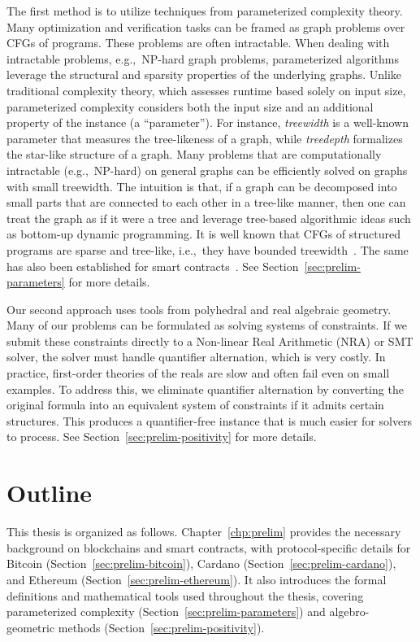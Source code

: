  The first method is to utilize techniques from parameterized complexity theory.
Many optimization and verification tasks can be framed as graph problems over CFGs of programs. These problems are often intractable. When dealing with intractable problems, e.g.,~NP-hard graph problems, parameterized algorithms leverage the structural and sparsity properties of the underlying graphs. Unlike traditional complexity theory, which assesses runtime based solely on input size, parameterized complexity considers both the input size and an additional property of the instance (a ``parameter''). For instance, \textit{treewidth} is a well-known parameter that measures the tree-likeness of a graph, while \textit{treedepth} formalizes the star-like structure of a graph. Many problems that are computationally intractable (e.g.,~NP-hard) on general graphs can be efficiently solved on graphs with small treewidth. The intuition is that, if a graph can be decomposed into small parts that are connected to each other in a tree-like manner, then one can treat the graph as if it were a tree and leverage tree-based algorithmic ideas such as bottom-up dynamic programming. It is well known that CFGs of structured programs are sparse and tree-like, i.e.,~they have bounded treewidth~\cite{thorup1998all}. The same has also been established for smart contracts~\cite{chatterjee2019treewidth}. See Section~\ref{sec:prelim-parameters} for more details.

 Our second approach uses tools from polyhedral and real algebraic geometry. Many of our problems can be formulated as solving systems of constraints. If we submit these constraints directly to a Non-linear Real Arithmetic (NRA) or SMT solver, the solver must handle quantifier alternation, which is very costly. In practice, first-order theories of the reals are slow and often fail even on small examples. To address this, we eliminate quantifier alternation by converting the original formula into an equivalent system of constraints if it admits certain structures. This produces a quantifier-free instance that is much easier for solvers to process. See Section~\ref{sec:prelim-positivity} for more details.
    
\section{Outline}
This thesis is organized as follows. Chapter~\ref{chp:prelim} provides the necessary background on blockchains and smart contracts, with protocol-specific details for Bitcoin (Section~\ref{sec:prelim-bitcoin}), Cardano (Section~\ref{sec:prelim-cardano}), and Ethereum (Section~\ref{sec:prelim-ethereum}). It also introduces the formal definitions and mathematical tools used throughout the thesis, covering parameterized complexity (Section~\ref{sec:prelim-parameters}) and algebro-geometric methods (Section~\ref{sec:prelim-positivity}).

